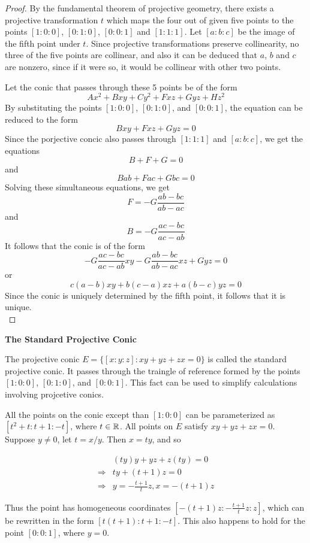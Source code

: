 \begin{proof}
 By the fundamental theorem of projective geometry, there exists a projective transformation
 $t$ which maps the four out of given five points to the points $[1:0:0]$, $[0:1:0]$, $[0:0:1]$
 and $[1:1:1]$. Let $[a:b:c]$ be the image of the fifth point under $t$. Since projective
 transformations preserve collinearity, no three of the five points are collinear, and also
 it can be deduced that $a$, $b$ and $c$ are nonzero, since if it were so, it would be collinear
 with other two points.

 Let the conic that passes through these 5 points be of the form
 \[
   Ax^2+Bxy+Cy^2+Fxz+Gyz+Hz^2
 \]
 By substituting the points $[1:0:0]$, $[0:1:0]$, and $[0:0:1]$, the equation can be reduced
 to the form
 \[
   Bxy+Fxz+Gyz=0
 \]
 Since the porjective concic also passes through $[1:1:1]$ and $[a:b:c]$, we get the equations
 \[
   B+F+G=0
 \]
 and
 \[
   Bab+Fac+Gbc=0
 \]
 Solving these simultaneous equations, we get
 \[
   F=-G\frac{ab-bc}{ab-ac}
 \]
 and
 \[
   B= -G\frac{ac-bc}{ac-ab}
 \]
 It follows that the conic is of the form
 \[
   -G\frac{ac-bc}{ac-ab}xy-G\frac{ab-bc}{ab-ac}xz+Gyz=0
 \]
 or
 \[
   c(a-b)xy+b(c-a)xz+a(b-c)yz=0
 \]
 Since the conic is uniquely determined by the fifth point, it follows that it is unique.\\
\end{proof}

\begin{remark}
  \textbf{The Standard Projective Conic}

  The projective conic $E=\{[x:y:z]:xy+yz+zx=0\}$ is called the standard projective conic.
  It passes through the traingle of reference formed by the points $[1:0:0]$, $[0:1:0]$, and
  $[0:0:1]$. This fact can be used to simplify calculations involving projcetive conics.

  All the points on the conic except than $[1:0:0]$ can be parameterized as $[t^2+t:t+1:-t]$,
  where $t\in\mathbb{R}$. All points on $E$ satisfy $xy+yz+zx=0$. Suppose $y\ne 0$, let $t=x/y$. Then
  $x=ty$, and so

  \begin{eqnarray*}
    & (ty)y+yz+z(ty)=0 \\
    \Longrightarrow & ty+(t+1)z=0 \\
    \Longrightarrow & y=-\frac{t+1}{t}z, x=-(t+1)z
  \end{eqnarray*}

  Thus the point has homogeneous coordinates $\left[-(t+1)z:-\frac{t+1}{t}z:z\right]$, which can
  be rewritten in the form $[t(t+1):t+1:-t]$. This also happens to hold for the point $[0:0:1]$,
  where $y=0$.
\end{remark}

